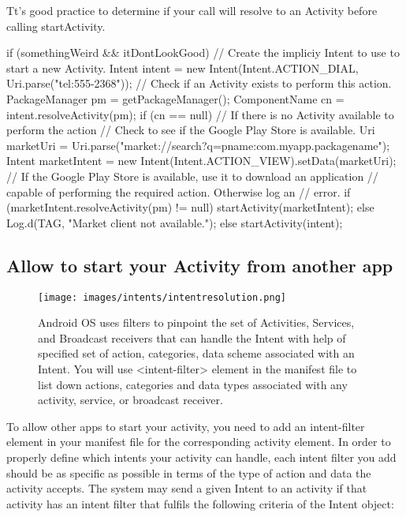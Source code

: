 \begin{framed}
Tt’s good practice to determine if your call will resolve to an Activity before calling startActivity.
\end{framed}

\begin{android}
if (somethingWeird && itDontLookGood) {
	// Create the impliciy Intent to use to start a new Activity.
	Intent intent =
	new Intent(Intent.ACTION_DIAL, Uri.parse("tel:555-2368"));
	// Check if an Activity exists to perform this action.
	PackageManager pm = getPackageManager();
	ComponentName cn = intent.resolveActivity(pm);
	if (cn == null) {
		// If there is no Activity available to perform the action
		// Check to see if the Google Play Store is available.
		Uri marketUri =
		Uri.parse("market://search?q=pname:com.myapp.packagename");
		Intent marketIntent = new Intent(Intent.ACTION_VIEW).setData(marketUri);
		// If the Google Play Store is available, use it to download an application
		// capable of performing the required action. Otherwise log an
		// error.
		if (marketIntent.resolveActivity(pm) != null){
			startActivity(marketIntent);
		}
		else{
			Log.d(TAG, "Market client not available.");
		}
	}
	else {
		startActivity(intent);
	}
}
\end{android}

\subsection{Allow to start your Activity from another app}

\begin{figure}
	\texttt{[image: images/intents/intentresolution.png]}
	\caption{Android OS uses filters to pinpoint the set of Activities, Services, and Broadcast receivers that can handle the Intent with help of specified set of action, categories, data scheme associated with an Intent. You will use <intent-filter> element in the manifest file to list down actions, categories and data types associated with any activity, service, or broadcast receiver.}
	\label{fig:intentresolution}
\end{figure}

To allow other apps to start your activity, you need to add an intent-filter element in your manifest file for the corresponding activity element. In order to properly define which intents your activity can handle, each intent filter you add should be as specific as possible in terms of the type of action and data the activity accepts. The system may send a given Intent to an activity if that activity has an intent filter that fulfils the following criteria of the Intent object:

